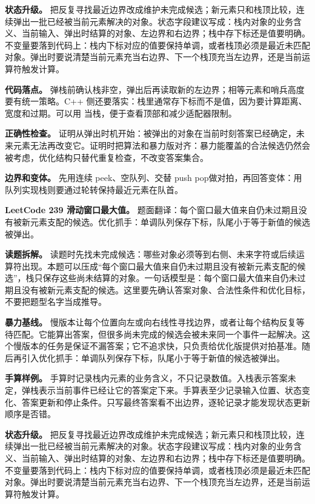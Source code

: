 \textbf{状态升级。} 把反复寻找最近边界改成维护未完成候选；新元素只和栈顶比较，连续弹出一批已经被当前元素解决的对象。状态字段建议写成：栈内对象的业务含义、当前输入、弹出时结算的对象、左边界和右边界；栈中存下标还是值要明确。不变量要落到代码上：栈内下标对应的值要保持单调，或者栈顶必须是最近未匹配对象。弹出时要说清楚当前元素充当右边界、下一个栈顶充当左边界，还是当前运算符触发计算。

\textbf{代码落点。} 弹栈前确认栈非空，弹出后再读取新的左边界；相等元素和哨兵高度要有统一策略。C++ 侧还要落实：栈里通常存下标而不是值，因为要计算距离、宽度和过期。可以用  当栈，便于查看顶部和减少适配器限制。

\textbf{正确性检查。} 证明从弹出时机开始：被弹出的对象在当前时刻答案已经确定，未来元素无法再改变它。证明时把算法和暴力版对齐：暴力能覆盖的合法候选仍然会被考虑，优化结构只替代重复检查，不改变答案集合。

\textbf{边界和变体。} 先用连续 peek、空队列、交替 push pop做对拍，再回答变体：用队列实现栈则要通过轮转保持最近元素在队首。

\noindent\textbf{LeetCode 239 滑动窗口最大值。} 题面翻译：每个窗口最大值来自仍未过期且没有被新元素支配的候选。优化抓手：单调队列保存下标，队尾小于等于新值的候选被弹出。

\textbf{读题拆解。} 读题时先找未完成候选：哪些对象必须等到右侧、未来字符或后续运算符出现。本题可以压成“每个窗口最大值来自仍未过期且没有被新元素支配的候选”，栈只保存这些尚未结算的对象。一句话模型是：每个窗口最大值来自仍未过期且没有被新元素支配的候选。这里要先确认答案对象、合法性条件和优化目标，不要把题型名字当成推导。

\textbf{暴力基线。} 慢版本让每个位置向左或向右线性寻找边界，或者让每个结构反复等待匹配。它能算出答案，但很多尚未完成的候选会被未来同一个事件一起解决。这个慢版本的任务是保证不漏答案；它不追求快，只负责给优化版提供对拍基准。随后再引入优化抓手：单调队列保存下标，队尾小于等于新值的候选被弹出。

\textbf{手算样例。} 手算时记录栈内元素的业务含义，不只记录数值。入栈表示答案未定，弹栈表示当前事件已经让它的答案定下来。手算表至少记录输入位置、状态变化、答案更新和停止条件。只写最终答案看不出边界，逐轮记录才能发现状态更新顺序是否错。

\textbf{状态升级。} 把反复寻找最近边界改成维护未完成候选；新元素只和栈顶比较，连续弹出一批已经被当前元素解决的对象。状态字段建议写成：栈内对象的业务含义、当前输入、弹出时结算的对象、左边界和右边界；栈中存下标还是值要明确。不变量要落到代码上：栈内下标对应的值要保持单调，或者栈顶必须是最近未匹配对象。弹出时要说清楚当前元素充当右边界、下一个栈顶充当左边界，还是当前运算符触发计算。

